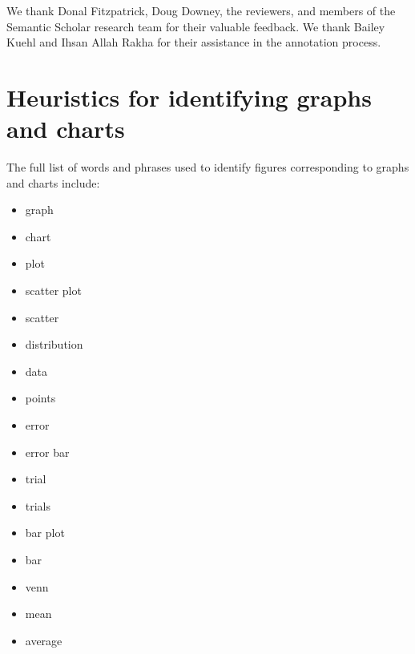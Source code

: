 \documentclass[sigconf]{acmart}
\begin{document}
\begin{acks}

We thank Donal Fitzpatrick, Doug Downey, the reviewers, and members of the Semantic Scholar research team for their valuable feedback. 
We thank Bailey Kuehl and Ihsan Allah Rakha for their assistance in the annotation process.

\end{acks}






\appendix

\section{Heuristics for identifying graphs and charts}
\label{app:heuristic_terms}

The full list of words and phrases used to identify figures corresponding to graphs and charts include:

\begin{itemize}
    \item graph
    \item chart
    \item plot
    \item scatter plot
    \item scatter
    \item distribution
    \item data
    \item points
    \item error
    \item error bar
    \item trial
    \item trials
    \item bar plot
    \item bar
    \item venn
    \item mean
    \item average 
\end{itemize}
\end{document}
